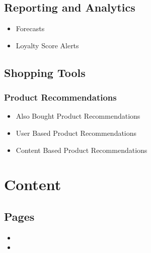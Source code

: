 \documentclass[letterpaper,10pt,english]{sphinxmanual}
\begin{document}
\subsection{Reporting and Analytics}
\label{\detokenize{product/user-guide/README:reporting-and-analytics}}\begin{itemize}
\item {} 
Forecasts

\item {} 
Loyalty Score Alerts

\end{itemize}


\subsection{Shopping Tools}
\label{\detokenize{product/user-guide/README:shopping-tools}}

\subsubsection{Product Recommendations}
\label{\detokenize{product/user-guide/README:product-recommendations}}\begin{itemize}
\item {} 
Also Bought Product Recommendations

\item {} 
User Based Product Recommendations

\item {} 
Content Based Product Recommendations

\end{itemize}


\section{Content}
\label{\detokenize{product/user-guide/README:content}}

\subsection{Pages}
\label{\detokenize{product/user-guide/README:pages}}\begin{itemize}
\item {} 

\item {} 

\end{itemize}
\end{document}
